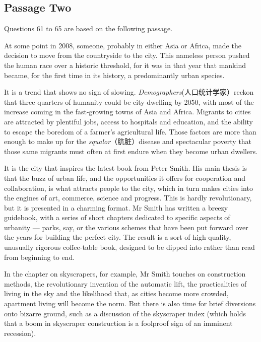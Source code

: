 \documentclass[UTF8,11pt]{ctexart}
\begin{document}
\subsection*{Passage Two}


Questions 61 to 65 are based on the following passage.


At some point in 2008, someone, probably in either Asia or Africa, made the decision to move from the countryside to the city. This nameless person pushed the human race over a historic threshold, for it was in that year that mankind became, for the first time in its history, a predominantly urban species.


It is a trend that shows no sign of slowing.\textit{ Demographers}(人口统计学家）reckon that three-quarters of humanity could be city-dwelling by 2050, with most of the increase coming in the fast-growing towns of Asia and Africa. Migrants to cities are attracted by plentiful jobs, access to hospitals and education, and the ability to escape the boredom of a farmer’s agricultural life. Those factors are more than enough to make up for the\textit{ squalor}（肮脏）disease and spectacular poverty that those same migrants must often at first endure when they become urban dwellers.


It is the city that inspires the latest book from Peter Smith. His main thesis is that the buzz of urban life, and the opportunities it offers for cooperation and collaboration, is what attracts people to the city, which in turn makes cities into the engines of art, commerce, science and progress. This is hardly revolutionary, but it is presented in a charming format. Mr Smith has written a breezy guidebook, with a series of short chapters dedicated to specific aspects of urbanity — parks, say, or the various schemes that have been put forward over the years for building the perfect city. The result is a sort of high-quality, unusually rigorous coffee-table book, designed to be dipped into rather than read from beginning to end.


In the chapter on skyscrapers, for example, Mr Smith touches on construction methods, the revolutionary invention of the automatic lift, the practicalities of living in the sky and the likelihood that, as cities become more crowded, apartment living will become the norm. But there is also time for brief diversions onto bizarre ground, such as a discussion of the skyscraper index (which holds that a boom in skyscraper construction is a foolproof sign of an imminent recession).
\end{document}
